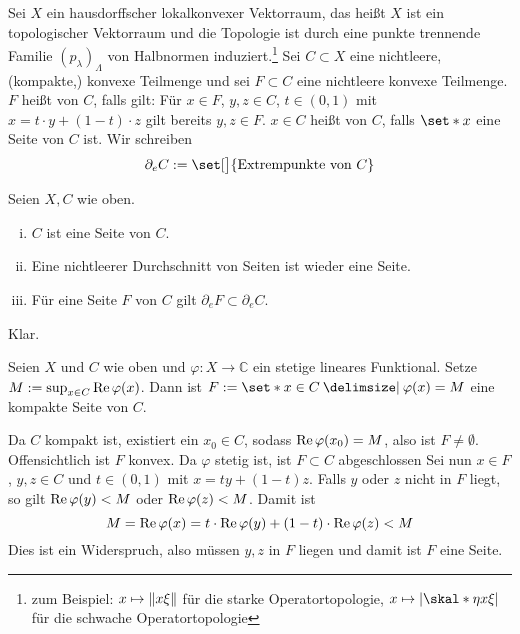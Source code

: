 \begin{definition}[{name=[Seiten und Extrempunkte]}]
	Sei $X$ ein hausdorffscher lokalkonvexer Vektorraum, das heißt $X$ ist ein topologischer Vektorraum und die Topologie ist durch eine punkte trennende Familie $(p_\lambda)_\Lambda$ von Halbnormen induziert.\footnote{zum Beispiel: $x \mapsto \norm*{x \xi}$ für die starke Operatortopologie, $x \mapsto \abs*{\skal*{\eta}{x \xi}} $ für die schwache Operatortopologie}
	Sei $C \subset X$ eine nichtleere, (kompakte,) konvexe Teilmenge und sei $F \subset C$ eine nichtleere konvexe Teilmenge.
	$F$ heißt  von $C$, falls gilt:  
	Für $x \in F$, $y,z \in C$, $t \in (0,1)$ mit $x= t \cdot y +(1-t) \cdot z$ gilt bereits $y,z \in F$.
	$x \in C$ heißt  von $C$, falls $\set*{x}$ eine Seite von $C$ ist.
	Wir schreiben 
	\[
		\partial_e C := \set[\big]{\text{Extrempunkte von } C}
	\]
\end{definition}

\begin{proposition}[{name=[grundlegen Eigenschaften von Seiten]},label=prop:78]
	Seien $X,C$ wie oben.
	\begin{enumerate}[(i),itemsep=0pt]
		\item $C$ ist eine Seite von $C$.
		\item Eine nichtleerer Durchschnitt von Seiten ist wieder eine Seite.
		\item Für eine Seite $F$ von $C$ gilt $\partial_e F \subset \partial_e C$.
	\end{enumerate}
\end{proposition}
\begin{beweis}
	Klar.
\end{beweis}

\begin{lemma}[label=lem:79,{name=[durch Funktional definierte Seite]}]
	Seien $X$ und $C$ wie oben und $\varphi \colon X \to \mathbb{C}$ ein stetige lineares Funktional.
	Setze $M :=\sup_{x \in C} \re \varphi(x)$.
	Dann ist $F:= \set*{x \in C \given \varphi(x)=M}$ eine kompakte Seite von $C$.
\end{lemma}
\begin{beweis}
	Da $C$ kompakt ist, existiert ein $x_0 \in C$, sodass $\re \varphi(x_0)=M$, also ist $F \neq \emptyset$.
	Offensichtlich ist $F$ konvex.
	Da $\varphi$ stetig ist, ist $F \subset C$ abgeschlossen 
	Sei nun $x \in F$, $y,z \in C$ und $t \in (0,1)$ mit $x= t y +(1-t)z$.
	Falls $y$ oder $z$ nicht in $F$ liegt, so gilt $\re \varphi(y) <M$ oder $\re \varphi(z)<M$.
	Damit ist 
	\[
		M = \re \varphi(x) = t \cdot \re \varphi(y) + (1-t) \cdot \re \varphi(z) <M
	\]
	Dies ist ein Widerspruch, also müssen $y,z$ in $F$ liegen und damit ist $F$ eine Seite. 
\end{beweis}


